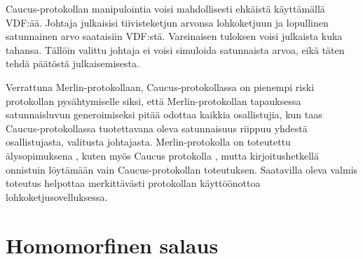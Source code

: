 Caucus-protokollan manipulointia voisi mahdollisesti ehkäistä käyttämällä VDF:ää. Johtaja julkaisisi tiivisteketjun arvonsa lohkoketjuun ja lopullinen satunnainen arvo saataisiin VDF:stä. Varsinaisen tuloksen voisi julkaista kuka tahansa. Tällöin valittu johtaja ei voisi simuloida satunnaista arvoa, eikä täten tehdä päätöstä julkaisemisesta.

Verrattuna Merlin-protokollaan, Caucus-protokollassa on pienempi riski protokollan pysähtymiselle siksi, että Merlin-protokollan tapauksessa satunnaisluvun generoimiseksi pitää odottaa kaikkia osallistujia, kun taas Caucus-protokollassa tuotettavana oleva satunnaisuus riippuu yhdestä osallistujasta, valitusta johtajasta. Merlin-protokolla on toteutettu älysopimuksena  \cite{MerlinChains}, kuten myös Caucus protokolla \cite{DBLP:journals/corr/abs-1801-07965}, mutta kirjoitushetkellä onnistuin löytämään vain Caucus-protokollan toteutuksen. Saatavilla oleva valmis toteutus helpottaa merkittävästi protokollan käyttöönottoa lohkoketjusovelluksessa.




\section{Homomorfinen salaus}